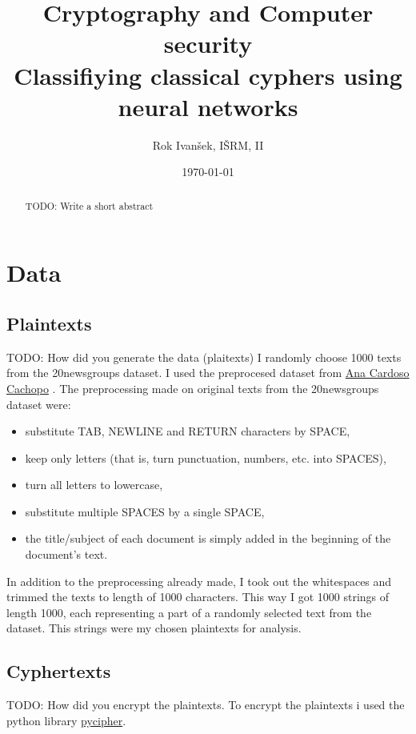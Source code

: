 \documentclass[a4paper]{article}
\title{Cryptography and Computer security\\
Classifiying classical cyphers using neural networks}
\author{Rok Ivanšek, IŠRM, II}
\date{\today}
\begin{document}
\maketitle


\begin{abstract}
TODO: Write a short abstract
\end{abstract}

\section*{Data}

\subsection*{Plaintexts}
TODO: How did you generate the data (plaitexts)
I randomly choose 1000 texts from the 20newsgroups dataset. I used the preprocesed dataset from \href{http://ana.cachopo.org/datasets-for-single-label-text-categorization}{Ana Cardoso Cachopo} \cite{2007:phd-Ana-Cardoso-Cachopo}. The preprocessing made on original texts from the 20newsgroups dataset were:

\begin{itemize}	
    \item substitute TAB, NEWLINE and RETURN characters by SPACE,
    \item keep only letters (that is, turn punctuation, numbers, etc. into SPACES),
    \item turn all letters to lowercase,
    \item substitute multiple SPACES by a single SPACE,
    \item the title/subject of each document is simply added in the beginning of the document's text.
\end{itemize}

In addition to the preprocessing already made, I took out the whitespaces and trimmed the texts to length of 1000 characters. This way I got 1000 strings of length 1000, each representing a part of a randomly selected text from the dataset. This strings were my chosen plaintexts for analysis.

\subsection*{Cyphertexts}
TODO: How did you encrypt the plaintexts.
To encrypt the plaintexts i used the python library \href{https://github.com/jameslyons/pycipher}{pycipher}.
\end{document}
